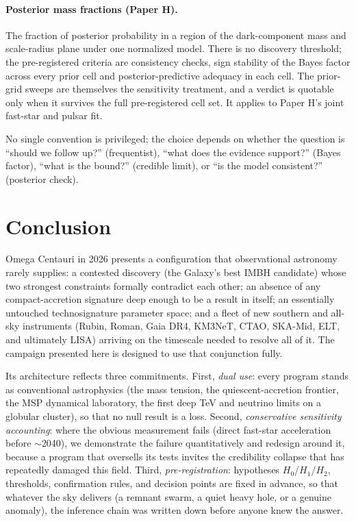 \documentclass[11pt]{article}
\begin{document}
\paragraph{Posterior mass fractions (Paper H).} The fraction of posterior probability in a region of the dark-component mass and scale-radius plane under one normalized model. There is no discovery threshold; the pre-registered criteria are consistency checks, sign stability of the Bayes factor across every prior cell and posterior-predictive adequacy in each cell. The prior-grid sweeps are themselves the sensitivity treatment, and a verdict is quotable only when it survives the full pre-registered cell set. It applies to Paper H's joint fast-star and pulsar fit.

No single convention is privileged; the choice depends on whether the question is ``should we follow up?'' (frequentist), ``what does the evidence support?'' (Bayes factor), ``what is the bound?'' (credible limit), or ``is the model consistent?'' (posterior check).

\section{Conclusion}
\label{sec:conclusion}

Omega Centauri in 2026 presents a configuration that observational astronomy rarely supplies: a contested discovery (the Galaxy's best IMBH candidate) whose two strongest constraints formally contradict each other; an absence of any compact-accretion signature deep enough to be a result in itself; an essentially untouched technosignature parameter space; and a fleet of new southern and all-sky instruments (Rubin, Roman, Gaia DR4, KM3NeT, CTAO, SKA-Mid, ELT, and ultimately LISA) arriving on the timescale needed to resolve all of it. The campaign presented here is designed to use that conjunction fully.

Its architecture reflects three commitments. First, \emph{dual use}: every program stands as conventional astrophysics (the mass tension, the quiescent-accretion frontier, the MSP dynamical laboratory, the first deep TeV and neutrino limits on a globular cluster), so that no null result is a loss. Second, \emph{conservative sensitivity accounting}: where the obvious measurement fails (direct fast-star acceleration before $\sim$2040), we demonstrate the failure quantitatively and redesign around it, because a program that oversells its tests invites the credibility collapse that has repeatedly damaged this field. Third, \emph{pre-registration}: hypotheses $H_0$/$H_1$/$H_2$, thresholds, confirmation rules, and decision points are fixed in advance, so that whatever the sky delivers (a remnant swarm, a quiet heavy hole, or a genuine anomaly), the inference chain was written down before anyone knew the answer.
\end{document}
